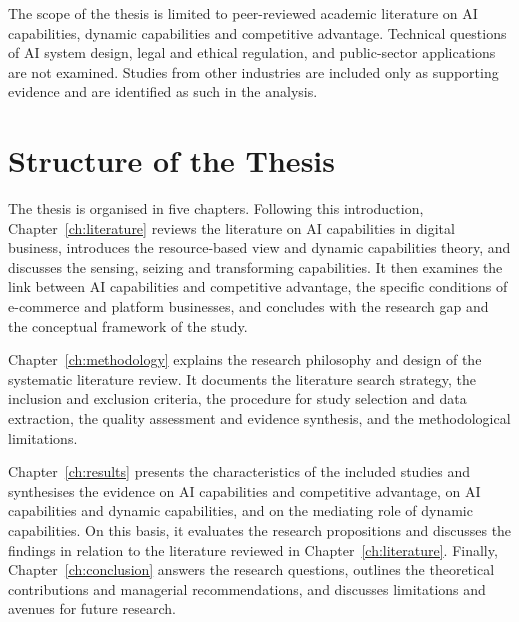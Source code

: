 The scope of the thesis is limited to peer-reviewed academic literature on AI capabilities, dynamic capabilities and competitive advantage. Technical questions of AI system design, legal and ethical regulation, and public-sector applications are not examined. Studies from other industries are included only as supporting evidence and are identified as such in the analysis.

\section{Structure of the Thesis}
\label{sec:structure}

The thesis is organised in five chapters. Following this introduction, Chapter~\ref{ch:literature} reviews the literature on AI capabilities in digital business, introduces the resource-based view and dynamic capabilities theory, and discusses the sensing, seizing and transforming capabilities. It then examines the link between AI capabilities and competitive advantage, the specific conditions of e-commerce and platform businesses, and concludes with the research gap and the conceptual framework of the study.

Chapter~\ref{ch:methodology} explains the research philosophy and design of the systematic literature review. It documents the literature search strategy, the inclusion and exclusion criteria, the procedure for study selection and data extraction, the quality assessment and evidence synthesis, and the methodological limitations.

Chapter~\ref{ch:results} presents the characteristics of the included studies and synthesises the evidence on AI capabilities and competitive advantage, on AI capabilities and dynamic capabilities, and on the mediating role of dynamic capabilities. On this basis, it evaluates the research propositions and discusses the findings in relation to the literature reviewed in Chapter~\ref{ch:literature}. Finally, Chapter~\ref{ch:conclusion} answers the research questions, outlines the theoretical contributions and managerial recommendations, and discusses limitations and avenues for future research.
